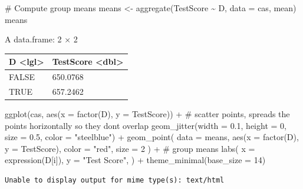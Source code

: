 \documentclass[
  12pt,
  letterpaper,
]{scrbook}
\newenvironment{Shaded}{\begin{snugshade}}{\end{snugshade}}
\newcommand{\AttributeTok}[1]{\textcolor[rgb]{0.40,0.45,0.13}{#1}}
\newcommand{\CommentTok}[1]{\textcolor[rgb]{0.37,0.37,0.37}{#1}}
\newcommand{\DecValTok}[1]{\textcolor[rgb]{0.68,0.00,0.00}{#1}}
\newcommand{\FloatTok}[1]{\textcolor[rgb]{0.68,0.00,0.00}{#1}}
\newcommand{\FunctionTok}[1]{\textcolor[rgb]{0.28,0.35,0.67}{#1}}
\newcommand{\NormalTok}[1]{\textcolor[rgb]{0.00,0.23,0.31}{#1}}
\newcommand{\OtherTok}[1]{\textcolor[rgb]{0.00,0.23,0.31}{#1}}
\newcommand{\SpecialCharTok}[1]{\textcolor[rgb]{0.37,0.37,0.37}{#1}}
\newcommand{\StringTok}[1]{\textcolor[rgb]{0.13,0.47,0.30}{#1}}
\theoremstyle{plain}
\theoremstyle{definition}
\theoremstyle{remark}
\begin{document}
\begin{Shaded}
\begin{Highlighting}[]
\CommentTok{\# Compute group means}
\NormalTok{means }\OtherTok{\textless{}{-}} \FunctionTok{aggregate}\NormalTok{(TestScore }\SpecialCharTok{\textasciitilde{}}\NormalTok{ D, }\AttributeTok{data =}\NormalTok{ cas, mean)}
\NormalTok{means}
\end{Highlighting}
\end{Shaded}

A data.frame: 2 × 2

\begin{longtable}[]{@{}ll@{}}
\toprule\noalign{}
D \textless lgl\textgreater{} & TestScore \textless dbl\textgreater{} \\
\midrule\noalign{}
\endhead
\bottomrule\noalign{}
\endlastfoot
FALSE & 650.0768 \\
TRUE & 657.2462 \\
\end{longtable}

\begin{Shaded}
\begin{Highlighting}[]
\FunctionTok{ggplot}\NormalTok{(cas, }\FunctionTok{aes}\NormalTok{(}\AttributeTok{x =} \FunctionTok{factor}\NormalTok{(D), }\AttributeTok{y =}\NormalTok{ TestScore)) }\SpecialCharTok{+}
    \CommentTok{\# scatter points, spreads the points horizontally so they don\textquotesingle{}t overlap}
    \FunctionTok{geom\_jitter}\NormalTok{(}\AttributeTok{width =} \FloatTok{0.1}\NormalTok{, }\AttributeTok{height =} \DecValTok{0}\NormalTok{, }\AttributeTok{size =} \FloatTok{0.5}\NormalTok{, }\AttributeTok{color =} \StringTok{"steelblue"}\NormalTok{) }\SpecialCharTok{+}
    \FunctionTok{geom\_point}\NormalTok{(}
        \AttributeTok{data =}\NormalTok{ means, }\FunctionTok{aes}\NormalTok{(}\AttributeTok{x =} \FunctionTok{factor}\NormalTok{(D), }\AttributeTok{y =}\NormalTok{ TestScore),}
        \AttributeTok{color =} \StringTok{"red"}\NormalTok{, }\AttributeTok{size =} \DecValTok{2}
\NormalTok{    ) }\SpecialCharTok{+} \CommentTok{\# group means}
    \FunctionTok{labs}\NormalTok{(}
        \AttributeTok{x =} \FunctionTok{expression}\NormalTok{(D[i]),}
        \AttributeTok{y =} \StringTok{"Test Score"}\NormalTok{,}
\NormalTok{    ) }\SpecialCharTok{+}
    \FunctionTok{theme\_minimal}\NormalTok{(}\AttributeTok{base\_size =} \DecValTok{14}\NormalTok{)}
\end{Highlighting}
\end{Shaded}

\begin{verbatim}
Unable to display output for mime type(s): text/html
\end{verbatim}
\end{document}
